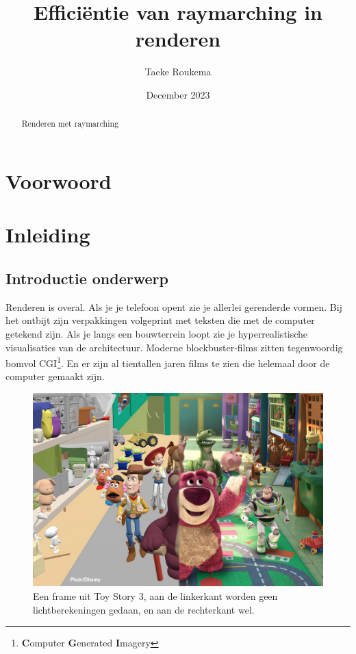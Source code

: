 \documentclass[12pt, a4paper]{article}
\title{Efficiëntie van raymarching in renderen}
\author{Taeke Roukema}
\date{December 2023}
\begin{document}
\maketitle
\begin{abstract}
Renderen met raymarching
\end{abstract}
\clearpage
\tableofcontents{}
\clearpage
\section{Voorwoord}
\clearpage
\section{Inleiding}
\subsection{Introductie onderwerp}

Renderen is overal. Als je je telefoon opent zie je allerlei gerenderde vormen. Bij het ontbijt zijn verpakkingen volgeprint met teksten die met de computer getekend zijn. Als je langs een bouwterrein loopt zie je hyperrealistische visualisaties van de architectuur. Moderne blockbuster-films zitten tegenwoordig bomvol CGI\footnote{\textbf{C}omputer \textbf{G}enerated \textbf{I}magery}. En er zijn al tientallen jaren films te zien die helemaal door de computer gemaakt zijn. 

\begin{figure}
    \includegraphics[width=1\linewidth]{toystory3comparison.jpg}
    \caption{Een frame uit Toy Story 3, aan de linkerkant worden geen lichtberekeningen gedaan, en aan de rechterkant wel.}
    \label{fig:toystory3}
\end{figure}
\end{document}
